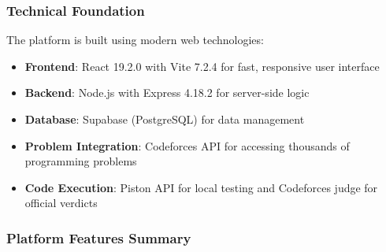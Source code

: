 \documentclass[12pt,a4paper]{article}
\begin{document}
\subsubsection{Technical Foundation}

The platform is built using modern web technologies:
\begin{itemize}
\item \textbf{Frontend}: React 19.2.0 with Vite 7.2.4 for fast, responsive user interface
\item \textbf{Backend}: Node.js with Express 4.18.2 for server-side logic
\item \textbf{Database}: Supabase (PostgreSQL) for data management
\item \textbf{Problem Integration}: Codeforces API for accessing thousands of programming problems
\item \textbf{Code Execution}: Piston API for local testing and Codeforces judge for official verdicts
\end{itemize}

\subsubsection{Platform Features Summary}
\end{document}
